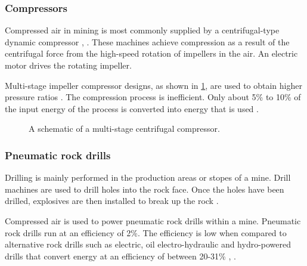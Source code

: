 \subsubsection{Compressors}

Compressed air in mining is most commonly supplied by a centrifugal-type dynamic compressor \cite{Fouche2016Masters}, \cite{Booysen2012Masters}. These machines achieve compression as a result of the centrifugal force from the high-speed rotation of impellers in the air. An electric motor drives the rotating impeller.
\par 
 Multi-stage impeller compressor designs, as shown in \cref{fig: Compressor diagram}\footnotemark[1], are used to obtain higher  pressure ratios \cite{Fouche2016Masters}. The compression process is inefficient. Only about 5\% to 10\% of the input energy of the process is converted into energy that is used \cite{yang2009air}. 
\begin{figure}[h]
	\centering
	\fbox{\hspace{3.5cm}\hspace{3cm}}
	\caption[A scematic of a multistage centrifugal compressor.]{A schematic of a multi-stage centrifugal compressor\protect \footnotemark[1].}
	\label{fig: Compressor diagram}
\end{figure}

\subsubsection{Pneumatic rock drills}
Drilling is mainly performed in the production areas or stopes of a mine. Drill machines are used to drill holes into the rock face. Once the holes have been drilled, explosives are then installed to break up the rock \cite{van2008development}.
\par
Compressed air is used to power pneumatic rock drills within a mine. Pneumatic rock drills run at an efficiency of 2\%. The efficiency is low when compared to alternative rock drills such as electric, oil electro-hydraulic and hydro-powered drills that convert energy at an efficiency of between 20-31\% \cite{fraser2008saving}, \cite{vanTonder2010Masters}. 
